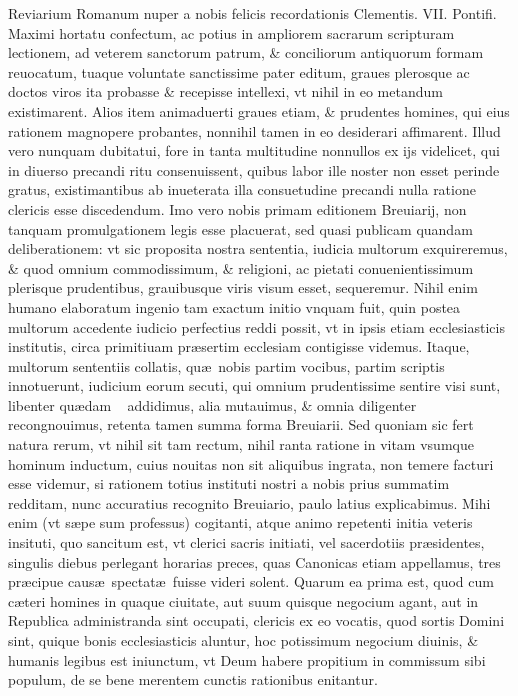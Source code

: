 \documentclass[a5paper,10pt]{book}
\def\ae{æ}
\begin{document}
Reviarium Romanum nuper a nobis felicis recordationis Clementis. VII. Pontifi. Maximi hortatu confectum, ac potius in ampliorem sacrarum scripturam lectionem, ad veterem sanctorum patrum, \& conciliorum antiquorum formam reuocatum, tuaque voluntate sanctissime pater editum, graues plerosque ac doctos viros ita probasse \& recepisse intellexi, vt nihil in eo metandum existimarent.
Alios item animaduerti graues etiam, \& prudentes homines, qui eius rationem magnopere probantes, nonnihil tamen in eo desiderari affimarent.
Illud vero nunquam dubitatui, fore in tanta multitudine nonnullos ex ijs videlicet, qui in diuerso precandi ritu consenuissent, quibus labor ille noster non esset perinde gratus, existimantibus ab inueterata illa consuetudine precandi nulla ratione clericis esse discedendum.
Imo vero nobis primam editionem Breuiarij, non tanquam promulgationem legis esse placuerat, sed quasi publicam quandam deliberationem:
vt sic proposita nostra sententia, iudicia multorum exquireremus, \& quod omnium commodissimum, \& religioni, ac pietati conuenientissimum plerisque prudentibus, grauibusque viris visum esset, sequeremur.
Nihil enim humano elaboratum ingenio tam exactum initio vnquam fuit, quin postea multorum accedente iudicio perfectius reddi possit, vt in ipsis etiam ecclesiasticis institutis, circa primitiuam pr\ae sertim ecclesiam contigisse videmus.
Itaque, multorum sententiis 
collatis, qu\ae \ nobis partim vocibus, partim scriptis innotuerunt, iudicium eorum secuti, qui omnium prudentissime sentire visi sunt, libenter qu\ae dam \ %
addidimus, alia mutauimus, \& omnia diligenter recongnouimus, retenta tamen summa forma Breuiarii.
Sed quoniam sic fert natura rerum, vt nihil sit tam rectum, nihil ranta ratione in vitam vsumque hominum inductum, cuius nouitas non sit aliquibus ingrata, non temere facturi esse videmur, si rationem totius instituti nostri a nobis prius summatim redditam, nunc accuratius recognito Breuiario, paulo latius explicabimus.
Mihi enim (vt s\ae pe sum professus) cogitanti, atque animo repetenti initia veteris insituti, quo sancitum est, vt clerici sacris initiati, vel sacerdotiis pr\ae sidentes, singulis diebus perlegant horarias preces, quas Canonicas etiam appellamus, tres pr\ae cipue caus\ae \ spectat\ae \ fuisse videri solent.
Quarum ea prima est, quod cum c\ae teri homines in quaque ciuitate, aut suum quisque negocium agant, aut in Republica administranda sint occupati, clericis ex eo vocatis, quod sortis Domini sint, quique bonis ecclesiasticis aluntur, hoc potissimum negocium diuinis, \& humanis legibus est iniunctum, vt Deum habere propitium in commissum sibi populum, de se bene merentem cunctis rationibus enitantur.
\end{document}
